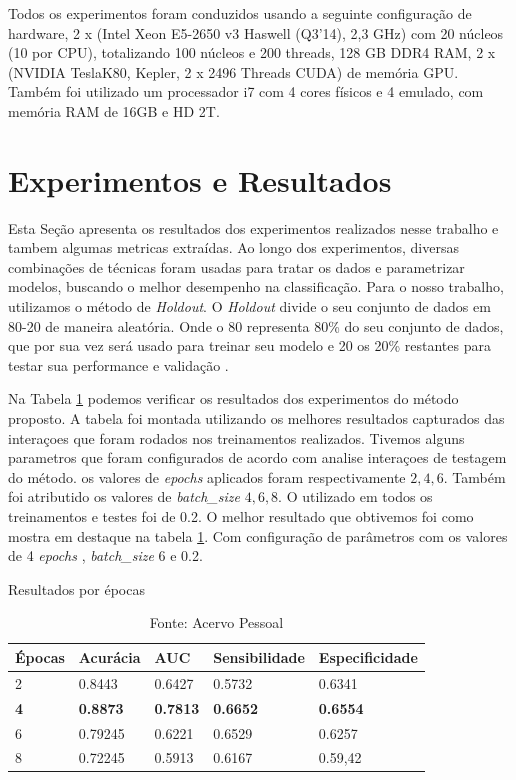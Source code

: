 \documentclass[openright]{UFRGS} %
\begin{document}
Todos os experimentos foram conduzidos usando a seguinte configuração de hardware, 2 x (Intel Xeon E5-2650 v3 Haswell (Q3'14), 2,3 GHz) com 20 núcleos (10 por CPU), totalizando 100 núcleos e 200 threads, 128 GB DDR4 RAM, 2 x (NVIDIA TeslaK80, Kepler, 2 x 2496 Threads CUDA) de memória GPU.  Também foi utilizado um processador i7 com 4 cores físicos e 4 emulado, com memória RAM de 16GB e HD 2T.



\section{Experimentos e Resultados}

Esta Seção apresenta os resultados dos experimentos  realizados
nesse trabalho e tambem algumas metricas extraídas. Ao longo dos experimentos, diversas combinações de técnicas foram usadas para tratar os dados e parametrizar modelos, buscando o melhor desempenho na classificação. Para o nosso trabalho, utilizamos o método de \textit{Holdout}. O \textit{Holdout}  divide o seu conjunto de dados em 80-20 de maneira aleatória. Onde o 80 representa 80\% do seu conjunto de dados, que por sua vez será usado para treinar seu modelo e 20 os 20\% restantes para testar sua performance e validação \cite{kim2009estimating}.

Na Tabela \ref{results}  podemos verificar os resultados dos experimentos do método proposto. A tabela foi montada utilizando os melhores resultados capturados das interaçoes que foram rodados nos treinamentos realizados.
Tivemos alguns parametros que foram configurados de acordo com analise interaçoes de testagem do método. os  valores de \textit{epochs} aplicados foram respectivamente  $2,4,6$. Também foi atributido os valores de  \textit{batch\_size}  $4,6,8$. O  utilizado em todos os treinamentos e testes foi de 0.2. O melhor resultado que obtivemos foi como mostra em destaque na tabela \ref{results}. Com configuração de parâmetros com os valores de  4  \textit{epochs} , \textit{batch\_size} 6 e  0.2. 



\begin{table}[h]
 \begin{center}
 \caption{Resultados por épocas }
\begin{tabular}{|l|l|l|l|l|}
\hline
Épocas & Acurácia & AUC    & Sensibilidade & Especificidade \\ \hline
2     & 0.8443    &  0.6427    &  0.5732                & 0.6341                \\ \hline
\textbf{4 }    & \textbf{0.8873}    & \textbf{0.7813} & \textbf{0.6652}        & \textbf{0.6554}         \\ \hline
6     & 0.79245   & 0.6221       &    0.6529           &     0.6257            \\ \hline

8    & 0.72245   & 0.5913       &    0.6167           &     0.59,42            \\ \hline
\end{tabular}
   \label{results}
\end{center}
\caption{Fonte: Acervo Pessoal}
\end{table}
\end{document}
